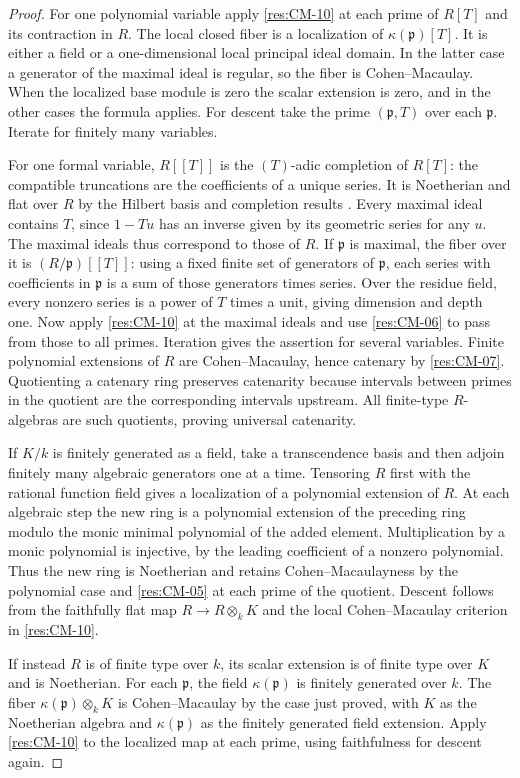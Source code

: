 \documentclass[11pt,oneside,openany]{book}
\theoremstyle{definition}
\theoremstyle{remark}
\begin{document}
\begin{proof}
For one polynomial variable apply \ref{res:CM-10} at
each prime of $R[T]$ and its contraction in $R$. The
local closed fiber is a localization of $\kappa(\mathfrak p)[T]$.
It is either a field or a one-dimensional local principal
ideal domain. In the latter case a generator of the
maximal ideal is regular, so the fiber is Cohen--Macaulay.
When the localized base module is zero the scalar extension
is zero, and in the other cases the formula applies.
For descent take the prime $(\mathfrak p,T)$ over each
$\mathfrak p$. Iterate for finitely many variables.

For one formal variable, $R[[T]]$ is the $(T)$-adic
completion of $R[T]$: the compatible truncations are the
coefficients of a unique series. It is Noetherian and
flat over $R$ by the Hilbert basis and completion results
\cite[Theorems ALG-05-C02-R01 and ALG-05-C04-S01]{p103}.
Every maximal ideal contains $T$, since $1-Tu$ has an
inverse given by its geometric series for any $u$.
The maximal ideals thus correspond to those of $R$. If
$\mathfrak p$ is maximal, the fiber over it is
$(R/\mathfrak p)[[T]]$: using a fixed finite set of
generators of $\mathfrak p$, each series with coefficients
in $\mathfrak p$ is a sum of those generators times series.
Over the residue field, every nonzero series is a power
of $T$ times a unit, giving dimension and depth one.
Now apply \ref{res:CM-10} at the maximal ideals and use
\ref{res:CM-06} to pass from those to all primes.
Iteration gives the assertion for several variables.
Finite polynomial extensions of $R$ are Cohen--Macaulay,
hence catenary by \ref{res:CM-07}. Quotienting a catenary
ring preserves catenarity because intervals between primes
in the quotient are the corresponding intervals upstream.
All finite-type $R$-algebras are such quotients, proving
universal catenarity.

If $K/k$ is finitely generated as a field, take a transcendence
basis and then adjoin finitely many algebraic generators one
at a time. Tensoring $R$ first with the rational function field
gives a localization of a polynomial extension of $R$.
At each algebraic step the new ring is a polynomial extension
of the preceding ring modulo the monic minimal polynomial
of the added element. Multiplication by a monic polynomial
is injective, by the leading coefficient of a nonzero
polynomial. Thus the new ring is Noetherian and retains
Cohen--Macaulayness by the polynomial case and \ref{res:CM-05}
at each prime of the quotient. Descent follows from the
faithfully flat map $R\to R\otimes_k K$ and the local
Cohen--Macaulay criterion in \ref{res:CM-10}.

If instead $R$ is of finite type over $k$, its scalar extension
is of finite type over $K$ and is Noetherian. For each $\mathfrak p$,
the field $\kappa(\mathfrak p)$ is finitely generated over $k$.
The fiber $\kappa(\mathfrak p)\otimes_k K$ is Cohen--Macaulay
by the case just proved, with $K$ as the Noetherian algebra
and $\kappa(\mathfrak p)$ as the finitely generated field
extension. Apply \ref{res:CM-10} to the localized map at
each prime, using faithfulness for descent again.
\end{proof}
\end{document}
